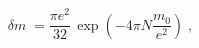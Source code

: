 \begin{equation}\label{eq:mr2}
\delta m \;=\frac{\pi e^2}{32} \, \exp (- 4 \pi N \frac{m_0}{e^2} ) \;,
\end{equation}

